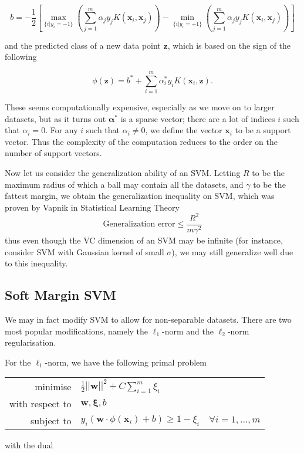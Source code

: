 \documentclass[11pt]{article}%
\def\ds{\displaystyle}
\def\bs{\boldsymbol}
\begin{document}
\[b = -\frac12\left[\max_{\{i|y_i=-1\}}\left(\sum_{j=1}^m \alpha_jy_jK(\bs x_i, \bs x_j)\right) - \min_{\{i|y_i=+1\}}\left(\sum_{j=1}^m\alpha_jy_jK(\bs x_i, \bs x_j)\right)\right]\]

and the predicted class of a new data point $\bs z$, which is based on the sign of the following

\[\phi(\bs z) = b^* + \sum_{i=1}^m \alpha_i^*y_iK(\bs x_i, \bs z).\]

These seems computationally expensive, especially as we move on to larger datasets, but as it turns out $\bs \alpha^*$ is a sparse vector; there are a lot of indices $i$ such that $\alpha_i = 0$. For any $i$ such that $\alpha_i\neq 0$, we define the vector $\bs x_i$ to be a support vector. Thus the complexity of the computation reduces to the order on the number of support vectors.

Now let us consider the generalization ability of an SVM. Letting $R$ to be the maximum radius of which a ball may contain all the datasets, and $\gamma$ to be the fattest margin, we obtain the generalization inequality on SVM, which was proven by Vapnik in Statistical Learning Theory
\[\text{Generalization error} \leq \frac{R^2}{m\gamma^2}\]
thus even though the VC dimension of an SVM may be infinite (for instance, consider SVM with Gaussian kernel of small $\sigma$), we may still generalize well due to this inequality.

\subsection{Soft Margin SVM}

We may in fact modify SVM to allow for non-separable datasets. There are two most popular modifications, namely the $\ell_1$-norm and the $\ell_2$-norm regularisation.

For the $\ell_1$-norm, we have the following primal problem

\begin{center}
\begin{tabular}{rll}
minimise & \multicolumn{2}{l}{$\ds \frac12 ||\bs w||^2 + C\sum_{i=1}^m \xi_i$} \\
with respect to & \multicolumn{2}{l}{$\bs w, \bs \xi, b$} \\
subject to & $y_i(\bs w\cdot \phi(\bs x_i)+b) \geq 1 - \xi_i$ & $\forall i=1,\ldots,m$
\end{tabular}
\end{center}

with the dual
\end{document}
